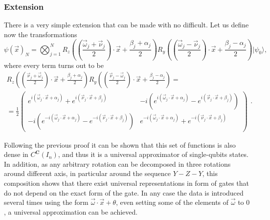 \documentclass[aps,amssymb,amsmath,amsfonts,pra,superscriptaddress,onecolumn]{revtex4}
\newcommand{\ket}[1]{| #1 \rangle}
\begin{document}
\subsubsection{Extension}
There is a very simple extension that can be made with no difficult. Let us define now the transformations
\begin{equation}\label{eq:qUAT_extended}
    \psi(\vec x)_N = \bigotimes_{j=1}^N  R_z\left(\left(\frac{\vec \omega_j + \vec \nu_j}{2}\right) \cdot \vec x + \frac{\beta_j + \alpha_j}{2}\right)R_y\left(\left(\frac{\vec \omega_j - \vec \nu_j}{2}\right) \cdot \vec x + \frac{\beta_j - \alpha_j}{2}\right)  \ket{\psi_0}, 
\end{equation}
where every term turns out to be
\begin{equation}
\begin{split}
R_z\left(\left(\frac{\vec \nu_j + \vec \omega_j}{2}\right) \cdot \vec x + \frac{\beta_j + \alpha_j}{2}\right)R_y\left(\left(\frac{\vec \nu_j - \vec \omega_j}{2}\right) \cdot \vec x + \frac{\beta_j - \alpha_j}{2}\right) = \\ =\frac{1}{2}
\begin{pmatrix}
e^{i (\vec \omega_j \cdot \vec x + \alpha_j)} + e^{i(\vec \nu_j \cdot \vec x + \beta_j)} & 
-i\left( e^{i (\vec \omega_j \cdot \vec x + \alpha_j)} - e^{i(\vec \nu_j \cdot \vec x + \beta_j)} \right) \\
-i\left( e^{-i (\vec \omega_j \cdot \vec x + \alpha_j)} - e^{-i(\vec \nu_j \cdot \vec x + \beta_j)} \right) & 
e^{-i (\vec \omega_j \cdot \vec x + \alpha_j)} + e^{-i(\vec \nu_j \cdot \vec x + \beta_j)}
\end{pmatrix}
\end{split}.
\end{equation}

Following the previous proof it can be shown that this set of functions is also dense in $C^{\mathbf{C}}(I_n)$, and thus it is a universal approximator of single-qubits states. In addition, as any arbitrary rotation can be decomposed in three rotations around different axis, in particular around the sequence $Y-Z-Y$, this composition shows that there exist universal representations in form of gates that do not depend on the exact form of the gate. In any case the data is introduced several times using the form $\vec \omega \cdot \vec x + \theta$, even setting some of the elements of $\vec \omega$ to $0$, a universal approximation can be achieved. 


\end{document}
